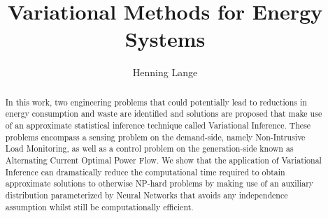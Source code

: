 
\title{Variational Methods for Energy Systems}

\author{Henning Lange}





\maketitle

\begin{abstract}
In this work, two engineering problems that could potentially lead to reductions in energy consumption and waste are identified and solutions are proposed that make use of an approximate statistical inference technique called Variational Inference. These problems encompass a sensing problem on the demand-side, namely Non-Intrusive Load Monitoring, as well as a control problem on the generation-side known as Alternating Current Optimal Power Flow. We show that the application of Variational Inference can dramatically reduce the computational time required to obtain approximate solutions to otherwise NP-hard problems by making use of an auxiliary distribution parameterized by Neural Networks that avoids any independence assumption whilst still be computationally efficient.
\end{abstract}

